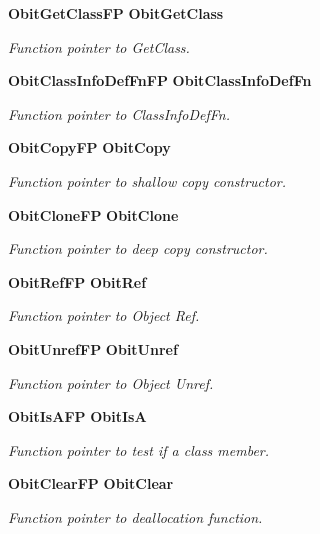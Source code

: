 \begin{CompactItemize}
{\bf Obit\-Get\-Class\-FP} {\bf Obit\-Get\-Class}
\begin{CompactList}\small\item\em Function pointer to Get\-Class. \item\end{CompactList}\item 
{\bf Obit\-Class\-Info\-Def\-Fn\-FP} {\bf Obit\-Class\-Info\-Def\-Fn}
\begin{CompactList}\small\item\em Function pointer to Class\-Info\-Def\-Fn. \item\end{CompactList}\item 
{\bf Obit\-Copy\-FP} {\bf Obit\-Copy}
\begin{CompactList}\small\item\em Function pointer to shallow copy constructor. \item\end{CompactList}\item 
{\bf Obit\-Clone\-FP} {\bf Obit\-Clone}
\begin{CompactList}\small\item\em Function pointer to deep copy constructor. \item\end{CompactList}\item 
{\bf Obit\-Ref\-FP} {\bf Obit\-Ref}
\begin{CompactList}\small\item\em Function pointer to Object Ref. \item\end{CompactList}\item 
{\bf Obit\-Unref\-FP} {\bf Obit\-Unref}
\begin{CompactList}\small\item\em Function pointer to Object Unref. \item\end{CompactList}\item 
{\bf Obit\-Is\-AFP} {\bf Obit\-Is\-A}
\begin{CompactList}\small\item\em Function pointer to test if a class member. \item\end{CompactList}\item 
{\bf Obit\-Clear\-FP} {\bf Obit\-Clear}
\begin{CompactList}\small\item\em Function pointer to deallocation function. \item\end{CompactList}\item 

\end{CompactItemize}
